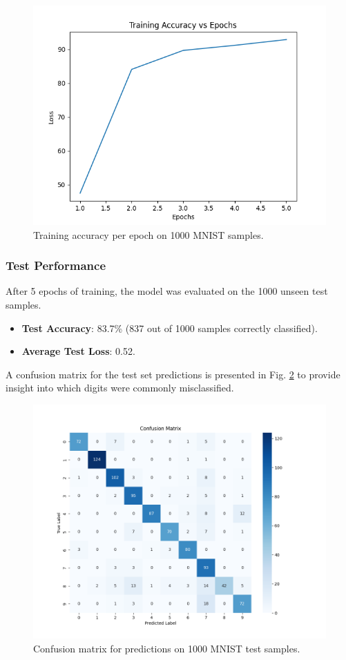\documentclass[conference]{IEEEtran}
\begin{document}
\begin{figure}[htbp]
    \centering
    \includegraphics[width=0.9\columnwidth]{accuracy_epochs.png}
    \caption{Training accuracy per epoch on 1000 MNIST samples.}
    \label{fig:accuracy_curve}
\end{figure}

\subsubsection{Test Performance}
After 5 epochs of training, the model was evaluated on the 1000 unseen test samples.
\begin{itemize}
    \item \textbf{Test Accuracy}: 83.7\% (837 out of 1000 samples correctly classified).
    \item \textbf{Average Test Loss}: 0.52.
\end{itemize}
A confusion matrix for the test set predictions is presented in Fig. \ref{fig:confusion_matrix} to provide insight into which digits were commonly misclassified.

\begin{figure}[htbp]
    \centering
    \includegraphics[width=0.9\columnwidth]{confusion_matrix.png}
    \caption{Confusion matrix for predictions on 1000 MNIST test samples.}
    \label{fig:confusion_matrix}
\end{figure}
\end{document}
